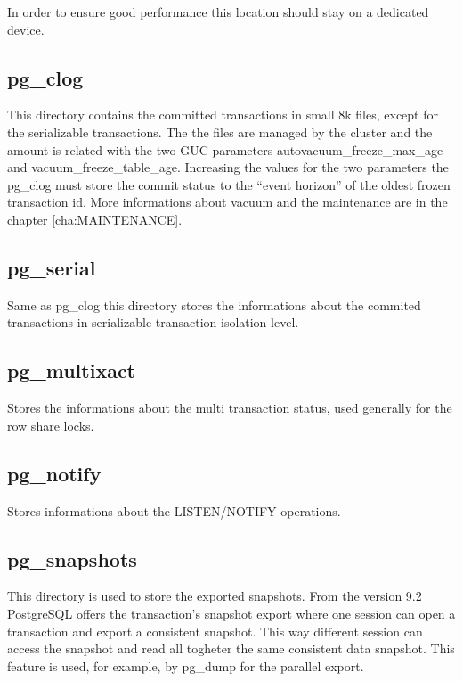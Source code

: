 In order to ensure good performance this location should stay on a dedicated 
device. 

\subsection{pg\_clog}
This directory contains the committed transactions in small 8k files, except 
for the serializable transactions.
The the files are managed by the cluster and the amount is related with 
the two GUC parameters autovacuum\_freeze\_max\_age and 
vacuum\_freeze\_table\_age.
Increasing the values for the two parameters the pg\_clog must store the commit 
status to the ``event horizon'' of the oldest frozen transaction id. 
More informations about vacuum and the maintenance are in 
the chapter \ref{cha:MAINTENANCE}.

\subsection{pg\_serial}
Same as pg\_clog this directory stores the informations about the commited 
transactions in serializable transaction isolation level.

\subsection{pg\_multixact}
Stores the informations about the multi transaction status, used generally for  
the row share locks.

\subsection{pg\_notify}
Stores informations about the LISTEN/NOTIFY operations.

\subsection{pg\_snapshots}
This directory is used to store the exported snapshots. From the version 9.2 
PostgreSQL offers the transaction's snapshot export where one session can 
open a transaction and export a consistent snapshot. This way different session 
can access the snapshot and read all togheter the same consistent data 
snapshot. This feature is used, for example, by pg\_dump for the parallel 
export.

